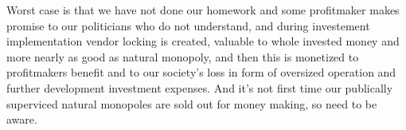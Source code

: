 Worst case is that we have not done our homework and some profitmaker makes
promise to our politicians who do not understand, and during investement
implementation vendor locking is created, valuable to whole invested money
and more nearly as good as natural monopoly, and then this is monetized to
profitmakers benefit and to our society's loss in form of oversized operation
and further development investment expenses. And it's not first time our
publically superviced natural monopoles are sold out for money making, so
need to be aware.
